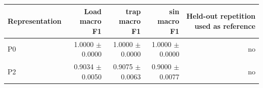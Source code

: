 \begin{tabular}{lrrrr}
\hline
Representation & Load macro F1 & trap macro F1 & sin macro F1 & Held-out repetition used as reference \\
\hline
P0 & 1.0000 $\pm$ 0.0000 & 1.0000 $\pm$ 0.0000 & 1.0000 $\pm$ 0.0000 & no \\
P2 & 0.9034 $\pm$ 0.0050 & 0.9075 $\pm$ 0.0063 & 0.9000 $\pm$ 0.0077 & no \\
\hline
\end{tabular}
